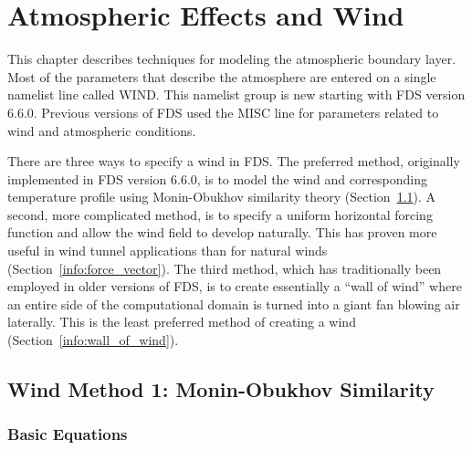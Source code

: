 \documentclass[11pt]{book}
\begin{document}
\chapter{Atmospheric Effects and Wind}

This chapter describes techniques for modeling the atmospheric boundary layer. Most of the parameters that describe the atmosphere are entered on a single namelist line called {\ct WIND}. This namelist group is new starting with FDS version 6.6.0. Previous versions of FDS used the {\ct MISC} line for parameters related to wind and atmospheric conditions.

There are three ways to specify a wind in FDS. The preferred method, originally implemented in FDS version 6.6.0, is to model the wind and corresponding temperature profile using Monin-Obukhov similarity theory (Section~\ref{info:WIND}). A second, more complicated method, is to specify a uniform horizontal forcing function and allow the wind field to develop naturally. This has proven more useful in wind tunnel applications than for natural winds (Section~\ref{info:force_vector}). The third method, which has traditionally been employed in older versions of FDS, is to create essentially a ``wall of wind'' where an entire side of the computational domain is turned into a giant fan blowing air laterally. This is the least preferred method of creating a wind (Section~\ref{info:wall_of_wind}).


\section{Wind Method 1: Monin-Obukhov Similarity}
\label{info:WIND}

\subsection{Basic Equations}
\end{document}
